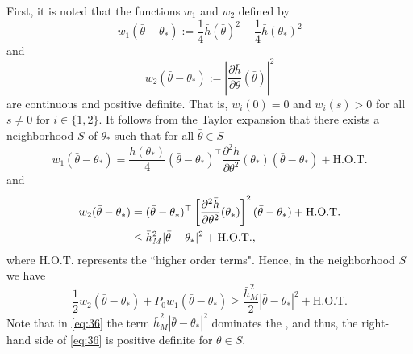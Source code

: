 \documentclass{ifacconf}
\begin{document}
\begin{pf}
    First, it is noted that the functions $w_1$ and $w_2$ defined by 
    \begin{equation}
        w_1(\bar{\theta}-\theta_*):= \frac{1}{4}\bar{h}(\bar{\theta})^2 -  \frac{1}{4}\bar{h}(\theta_*)^2
    \end{equation}
    and 
    \begin{equation}
        w_2(\bar{\theta}-\theta_*):=\left|\frac{\partial \bar{h}}{\partial \theta}(\bar{\theta}) \right|^2
    \end{equation}
    are continuous and positive definite. That is, $w_i(0)=0$ and $w_i(s)>0$ for all $s\ne 0$ for $i\in\{1,2\}$. It follows from the Taylor expansion that there exists a neighborhood $S$ of $\theta_*$ such that for all $\bar{\theta}\in S$
    \begin{equation}\label{eq:w1}
        w_1(\bar{\theta}-\theta_*) = \frac{\bar{h}(\theta_*)}{4}(\bar{\theta}-\theta_*)^\top \frac{\partial^2 \bar{h}}{\partial \theta^2}(\theta_*)(\bar{\theta}-\theta_*) + \text{H.O.T.}
    \end{equation}
    and
    \begin{align}\label{eq:w2}
        w_2(\bar{\theta}-\theta_*) &= (\bar{\theta}-\theta_*)^\top \left[\frac{\partial^2 \bar{h}}{\partial \theta^2}(\theta_*)\right]^2(\bar{\theta}-\theta_*) + \text{H.O.T.} \notag \\
        &\le \bar{h}_M^2 |\bar{\theta}-\theta_*|^2 + \text{H.O.T.},
    \end{align}
    where $\text{H.O.T.}$ represents the ``higher order terms".
    Hence, in the neighborhood $S$ we have
    \begin{equation}\label{eq:36}
        \frac{1}{2}w_2(\bar{\theta}-\theta_*)+P_0 w_1(\bar{\theta}-\theta_*)\ge \frac{\bar{h}_M^2}{2}|\bar{\theta}-\theta_*|^2 + \text{H.O.T.}
    \end{equation}
    Note that in \eqref{eq:36} the term $\bar{h}_M^2|\bar{\theta}-\theta_*|^2$ dominates the , and thus, the right-hand side of \eqref{eq:36} is positive definite for $\bar{\theta}\in S$.
    

\end{pf}
\end{document}
